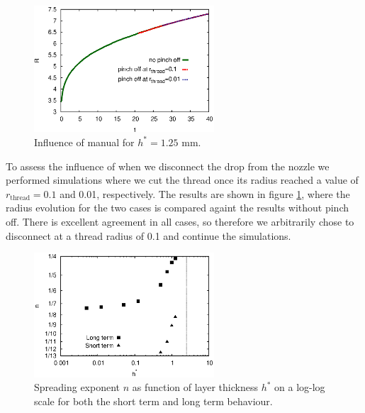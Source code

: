 \documentclass[aip,graphicx]{revtex4-1}
\newcommand{\sym}[1]{\text{#1}}
\begin{document}
\begin{figure}[!ht]
\centering
\includegraphics[width=0.6\textwidth]{figures/radius_vs_time_influence_pinch_off.eps}
\caption{Influence of manual for $h^*=1.25$ mm.}
\label{fig:radius_vs_time_influence_pinch_off}
\end{figure}

To assess the influence of when we disconnect the drop from the nozzle we performed simulations where we cut the thread once its radius reached a value of $r_{\sym{thread}}=0.1$ and 0.01, respectively.
The results are shown in figure \ref{fig:radius_vs_time_influence_pinch_off}, where the radius evolution for the two cases is compared againt the results without pinch off.
There is excellent agreement in all cases, so therefore we arbitrarily chose to disconnect at a thread radius of 0.1 and continue the simulations. \\

\begin{figure}[!ht]
\centering
\includegraphics[width=0.6\textwidth]{figures/scaling_vs_layer_inc_short_time.eps}
\caption{Spreading exponent $n$ as function of layer thickness $h^*$ on a log-log scale for both the short term and long term behaviour.}
\label{fig:scaling_vs_layer}
\end{figure}
\end{document}
